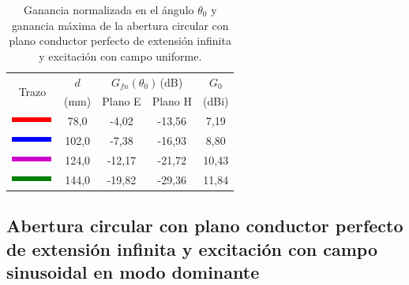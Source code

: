 \begin{table}[H]
\centering
\begin{tabular}{|c|c|c|c|c|}
\hline
\multirow{2}{*}{Trazo} & $d$ & \multicolumn{2}{c|}{$G_{fn}\left(\theta_0\right)\,$(dB)} & $G_0$ \\
\cline{3-4}
& (mm) & Plano E & Plano H & (dBi)\\
\hline
\includegraphics[scale = 1]{Figures/Estudio/linea_tabla_rojo} & 78,0 & -4,02 & -13,56 & 7,19 \\
\hline
\includegraphics[scale = 1]{Figures/Estudio/linea_tabla_azul} & 102,0 & -7,38 & -16,93 & 8,80 \\
\hline
\includegraphics[scale = 1]{Figures/Estudio/linea_tabla_violeta} & 124,0 & -12,17 & -21,72 & 10,43 \\
\hline
\includegraphics[scale = 1]{Figures/Estudio/linea_tabla_verde} & 144,0 & -19,82 & -29,36 & 11,84 \\
\hline
\end{tabular}
\caption{Ganancia normalizada en el ángulo $\theta_0$ y ganancia máxima de la abertura circular con plano conductor perfecto de extensión infinita y excitación con campo uniforme.}
\label{tabla_estudio:3}
\end{table}

\subsection{Abertura circular con plano conductor perfecto de extensión infinita y excitación con campo sinusoidal en modo dominante}
\label{subsec_estudio_abert_circ_inf_dom}


